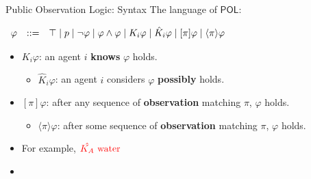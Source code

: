 \documentclass[usenames,dvipsnames]{beamer}
\newcommand\ldiaarg[1]{\langle#1\rangle}
\newcommand{\POL}{\mathsf{POL}}
\newcommand{\union}{\cup}
\newcommand{\ep}{\ensuremath{\varepsilon}}
\newcommand{\obsright}{\blacktriangleright}
\newcommand{\obsleft}{\blacktriangleleft}
\newcommand{\obsup}{\blacktriangle}
\newcommand{\obsdown}{\blacktriangledown}
\newcommand{\expwater}{(\obsright \union \obsup)^* (\obsdown \union \obsleft \union \ep) (\obsright \union \obsup)^*}
\newcommand{\exppower}{(\obsleft \union \obsdown)^* (\obsup \union \obsright \union \ep) (\obsleft \union \obsdown)^*}
\newcommand{\exppatrol}{(\obsright^+ \obsdown^+ \obsleft^+ \obsup^+)^*}
\renewcommand{\phi}{\varphi}
\begin{document}
\begin{frame}{Public Observation Logic: Syntax\footnotemark[1]}
The language of $\POL$:
\vspace{.1cm}
			
		     $\begin{array}{r@{\quad::= \quad}l}
				\phi  &
				\top
				\mid
				p
				\mid \neg \phi
				\mid \phi \land \phi
				\mid K_i\phi
				\mid \hat{K}_i \phi
				\mid [\pi] \phi
				\mid \ldiaarg{\pi} \phi
			\end{array}$
			
			\vspace{.1cm}
    \begin{itemize}
        \item $K_i\varphi$: an agent $i$ \textbf{knows} $\varphi$ holds.
        \vspace{.1cm}
        \begin{itemize}
            \item $\hat{K}_i\phi$: an agent $i$ considers $\varphi$ \textbf{possibly} holds.
        \end{itemize}
        \vspace{.1cm}
        \item $[\pi]\varphi$: after any sequence of \textbf{observation} matching $\pi$, $\varphi$ holds.
        \vspace{.1cm}
        \begin{itemize}
            \item $\ldiaarg{\pi}\phi$: after some sequence of \textbf{observation} matching $\pi$, $\varphi$ holds.
        \end{itemize}
        \vspace{.1cm}
        \item For example, $\textcolor{red}{\hat{K_A} \textrm{ water }}$
    
    \item[]
    
    \begin{figure}
        \newcommand{\sizefield}{7}
	    

\end{figure}
\end{itemize}
\end{frame}
\end{document}

